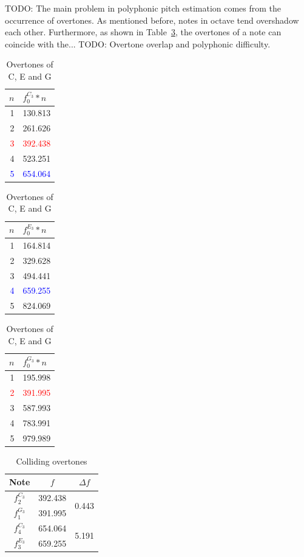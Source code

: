 \documentclass[10pt,twocolumn]{article}
\begin{document}
TODO: The main problem in polyphonic pitch estimation comes from the occurrence of overtones. As mentioned before, notes in octave tend overshadow each other. Furthermore, as shown in Table~\ref{tab:overtones}, the overtones of a note can coincide with the...
TODO: Overtone overlap and polyphonic difficulty.
\begin{table}[H]
    \centering
    \hfill
    \begin{tabular}{r|l}
        $n$ & $f^{C_3}_0*n$ \\
        \hline
        1 & 130.813 \\
        2 & 261.626 \\
        \textcolor{red}{3} & \textcolor{red}{392.438} \\
        4 & 523.251 \\
        \textcolor{blue}{5} & \textcolor{blue}{654.064}
    \end{tabular}
    \hfill
    \begin{tabular}{r|l}
        $n$ & $f^{E_3}_0*n$ \\
        \hline
        1 & 164.814 \\
        2 & 329.628 \\
        3 & 494.441 \\
        \textcolor{blue}{4} & \textcolor{blue}{659.255} \\
        5 & 824.069
    \end{tabular}
    \hfill
    \begin{tabular}{r|l}
        $n$ & $f^{G_3}_0*n$ \\
        \hline
        1 & 195.998 \\
        \textcolor{red}{2} & \textcolor{red}{391.995} \\
        3 & 587.993 \\
        4 & 783.991 \\
        5 & 979.989
    \end{tabular}
    \hfill
    \caption{Overtones of C, E and G}
    \label{tab:overtones}
\end{table}
\begin{table}[H]
    \centering
    \begin{tabular}{c|c|c}
        Note & $f$ & $\Delta f$ \\
        \hline
        $f^{C_3}_2$ & 392.438 & \multirow{2}{*}{0.443} \\
        $f^{G_3}_1$ & 391.995 & \\
        \hline
        $f^{C_3}_4$ & 654.064 & \multirow{2}{*}{5.191} \\
        $f^{E_3}_3$ & 659.255 &
    \end{tabular}
    \caption{Colliding overtones}
    \label{tab:diff}
\end{table}
\end{document}
